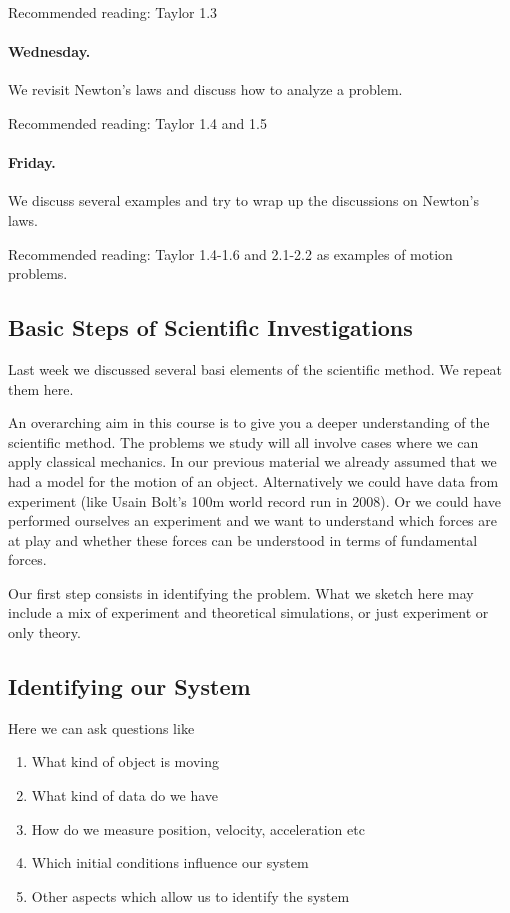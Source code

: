 \documentclass[%
oneside,                 %
final,                   %
10pt]{article}
\begin{document}
Recommended reading: Taylor 1.3

\paragraph{Wednesday.}
We revisit Newton's laws and discuss how to analyze a problem.

Recommended reading: Taylor 1.4 and 1.5

\paragraph{Friday.}
We discuss several examples and try to wrap up the discussions on Newton's laws.

Recommended reading: Taylor 1.4-1.6 and 2.1-2.2 as examples of motion problems.

\subsection*{Basic Steps of Scientific Investigations}

Last week we discussed several basi elements of the scientific method. We repeat them here.

An overarching aim in this course is to give you a deeper
understanding of the scientific method. The problems we study will all
involve cases where we can apply classical mechanics. In our previous
material we already assumed that we had a model for the motion of an
object.  Alternatively we could have data from experiment (like Usain
Bolt's 100m world record run in 2008).  Or we could have performed
ourselves an experiment and we want to understand which forces are at
play and whether these forces can be understood in terms of
fundamental forces.

Our first step consists in identifying the problem. What we sketch
here may include a mix of experiment and theoretical simulations, or
just experiment or only theory.

\subsection*{Identifying our System}

Here we can ask questions like
\begin{enumerate}
\item What kind of object is moving

\item What kind of data do we have

\item How do we measure position, velocity, acceleration etc

\item Which initial conditions influence our system

\item Other aspects which allow us to identify the system
\end{enumerate}
\end{document}
